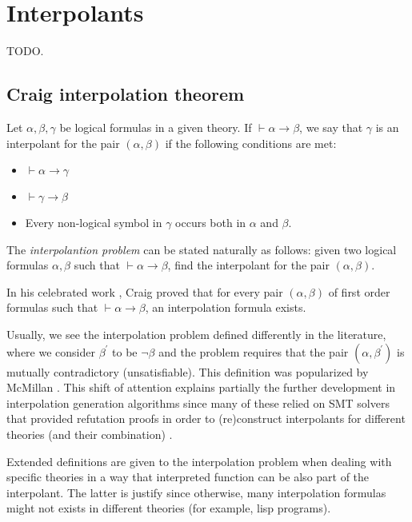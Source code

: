 \section{Interpolants}

TODO.

\subsection{Craig interpolation theorem}

Let $\alpha, \beta, \gamma$ be logical formulas in a given theory. If
$\vdash \alpha \rightarrow \beta$, we say that $\gamma$ is an
interpolant for the pair $(\alpha, \beta)$ if the following conditions
are met:

\begin{itemize}
\item $\vdash \alpha \rightarrow \gamma$
\item $\vdash \gamma \rightarrow \beta$
\item Every non-logical symbol in $\gamma$ occurs both in $\alpha$ and
  $\beta$.
\end{itemize}

The \emph{interpolantion problem} can be stated naturally as follows: given two
logical formulas $\alpha, \beta$ such that $\vdash \alpha \rightarrow \beta$, find
the interpolant for the pair $(\alpha, \beta)$.

In his celebrated work \cite{10.2307/2963594}, Craig proved that for every pair
$(\alpha, \beta)$ of first order formulas such that
$\vdash \alpha \rightarrow \beta$, an interpolation formula exists.

Usually, we see the interpolation problem defined differently in the literature, where
we consider $\beta^{'}$ to be $\neg \beta$ and the problem requires that the pair $(\alpha, \beta^{'})$
is mutually contradictory (unsatisfiable). This definition was popularized by McMillan
\cite{10.1007/978-3-540-24730-2_2}. This shift of attention explains partially the further
development in interpolation generation algorithms since many of these relied on
SMT solvers that provided refutation proofs in order to (re)construct interpolants
for different theories (and their combination) \cite{10.1007/978-3-642-02959-2_17,
  10.1007/978-3-642-36742-7_9, mcmillan2011interpolants}.

Extended definitions are given to the interpolation problem when dealing with specific
theories \cite{10.1007/11532231_26} in a way that interpreted function can be also part of
the interpolant. The latter is justify since otherwise, many interpolation formulas might
not exists in different theories (for example, lisp programs).


